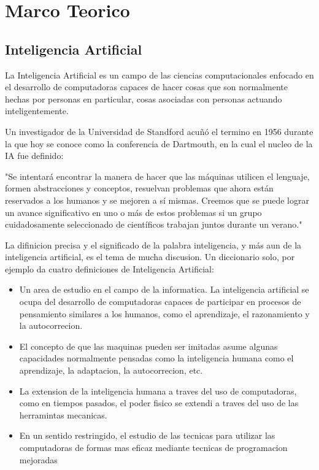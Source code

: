 \section{Marco Teorico}

\subsection{Inteligencia Artificial}

La Inteligencia Artificial es un campo de las ciencias computacionales enfocado en el desarrollo de computadoras capaces de hacer cosas que son normalmente hechas por personas en particular, cosas asociadas con personas actuando inteligentemente.

Un investigador de la Universidad de Standford acuñó el termino en 1956 durante la que hoy se conoce como la conferencia de Dartmouth, en la cual el nucleo de la IA fue definido:

"Se intentará encontrar la manera de hacer que las máquinas utilicen el lenguaje, formen abstracciones y conceptos, resuelvan problemas que ahora están reservados a los humanos y se mejoren a sí mismas. Creemos que se puede lograr un avance significativo en uno o más de estos problemas si un grupo cuidadosamente seleccionado de científicos trabajan juntos durante un verano."

La difinicion precisa y el significado de la palabra inteligencia, y más aun de la inteligencia artificial, es el tema de mucha discusion. Un diccionario solo, por ejemplo da cuatro definiciones de Inteligencia Artificial:

\begin{itemize}
    \item Un area de estudio en el campo de la informatica. La inteligencia artificial se ocupa del desarrollo de computadoras capaces de participar en procesos de pensamiento similares a los humanos, como el aprendizaje, el razonamiento y la autocorrecion.
    
    \item El concepto de que las maquinas pueden ser imitadas asume algunas capacidades normalmente pensadas como la inteligencia humana como el aprendizaje, la adaptacion, la autocorrecion, etc.
    
    \item La extension de la inteligencia humana a traves del uso de computadoras, como en tiempos pasados, el poder fisico se extendi a traves del uso de las herramintas mecanicas.
    
    \item En un sentido restringido, el estudio de las tecnicas para utilizar las computadoras de formas mas eficaz mediante tecnicas de programacion mejoradas
    
\end{itemize}

